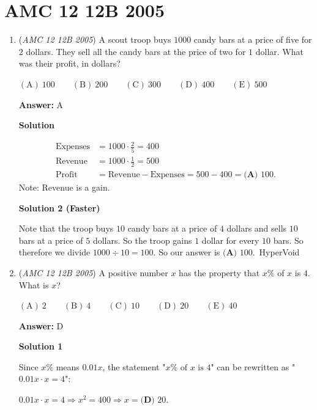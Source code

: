 \section{AMC 12 12B 2005}
        \begin{enumerate}
        	\item (\textit{AMC 12 12B 2005}) A scout troop buys $1000$ candy bars at a price of five for $2$ dollars. They sell all the candy bars at the price of two for $1$ dollar.  What was their profit, in dollars?


 $\mathrm{(A)}\ 100      \qquad \mathrm{(B)}\ 200      \qquad \mathrm{(C)}\ 300      \qquad \mathrm{(D)}\ 400      \qquad \mathrm{(E)}\ 500$

 \textbf{Answer: }A



\textbf{Solution}


 \begin{align*} \mbox{Expenses} &= 1000 \cdot \frac25 = 400 \\ \mbox{Revenue}  &= 1000 \cdot \frac12 = 500 \\ \mbox{Profit}   &= \mbox{Revenue} - \mbox{Expenses} = 500-400 = \boxed{\textbf{(A) }100}. \end{align*}
Note: Revenue is a gain.

 



\textbf{Solution 2 (Faster)}

Note that the troop buys $10$ candy bars at a price of $4$ dollars and sells $10$ bars at a price of $5$ dollars. So the troop gains $1$ dollar for every $10$ bars. So therefore we divide $1000 \div 10 = 100$. So our answer is $\boxed{\textbf{(A) }100}$.~HyperVoid

 


	\item (\textit{AMC 12 12B 2005}) A positive number $x$ has the property that $x\%$ of $x$ is $4$.  What is $x$?


 $\mathrm{(A)}\ 2      \qquad \mathrm{(B)}\ 4      \qquad \mathrm{(C)}\ 10      \qquad \mathrm{(D)}\ 20      \qquad \mathrm{(E)}\ 40$

 \textbf{Answer: }D



\textbf{Solution 1}

Since $x\%$ means $0.01x$, the statement "$x\% \text{ of } x \text{ is 4}$" can be rewritten as "$0.01x \cdot x = 4$":

 $0.01x \cdot x=4 \Rightarrow x^2 = 400 \Rightarrow x = \boxed{\textbf{(D) }20}.$





\end{enumerate}
